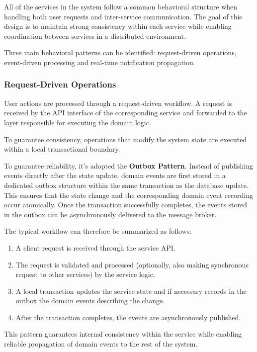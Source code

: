 All of the services in the system follow a common behavioral structure when handling both user requests and inter-service communication.
The goal of this design is to maintain strong consistency within each service while enabling coordination between services in a distributed environment.

Three main behavioral patterns can be identified: request-driven operations, event-driven processing and real-time notification propagation.

\subsubsection{Request-Driven Operations}

User actions are processed through a request-driven workflow. A request is received by the API interface of the corresponding service and forwarded to the layer responsible for executing the domain logic.

To guarantee consistency, operations that modify the system state are executed within a local transactional boundary.

To guarantee reliability, it's adopted the \textbf{Outbox Pattern}. Instead of publishing events directly after the state update, domain events are first stored in a dedicated outbox structure within the same transaction as the database update. This ensures that the state change and the corresponding domain event recording occur atomically.
Once the transaction successfully completes, the events stored in the outbox can be asynchronously delivered to the message broker.

The typical workflow can therefore be summarized as follows:
\begin{enumerate}
  \item A client request is received through the service API.
  \item The request is validated and processed (optionally, also making synchronous request to other services) by the service logic.
  \item A local transaction updates the service state and if necessary records in the outbox the domain events describing the change.
  \item After the transaction completes, the events are asynchronously published.
\end{enumerate}

This pattern guarantees internal consistency within the service while enabling reliable propagation of domain events to the rest of the system.

